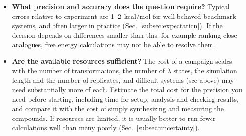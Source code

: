 \documentclass[9pt,bestpractices]{livecoms}
\begin{document}
\begin{itemize}
\item \textbf{What precision and accuracy does the question require?}
Typical errors relative to experiment are 1--2~kcal/mol for well-behaved
benchmark systems, and often larger in practice (Sec.~\ref{subsec:expectation}).
If the decision depends on differences smaller than this, for example ranking
close analogues, free energy calculations may not be able to resolve them.

\item \textbf{Are the available resources sufficient?}
The cost of a campaign scales with the number of transformations, the number of
$\lambda$ states, the simulation length and the number of replicates, and
difficult systems (see above) may need substantially more of each. Estimate the
total cost for the precision you need before starting, including time for
setup, analysis and checking results, and compare it with the cost of simply
synthesizing and measuring the compounds. If resources are limited, it is
usually better to run fewer calculations well than many poorly
(Sec.~\ref{subsec:uncertainty}).

\end{itemize}



\end{document}
